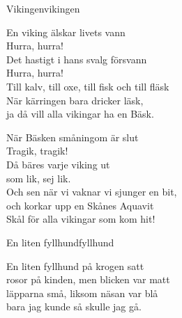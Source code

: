 \begin{song}{Vikingen}{vikingen}
\begin{vers}
En viking älskar livets vann\\
Hurra, hurra!\\
Det hastigt i hans svalg försvann\\
Hurra, hurra!\\
Till kalv, till oxe, till fisk och till fläsk\\
När kärringen bara dricker läsk,   \\
ja då vill alla vikingar ha en Bäsk.\\
\end{vers}
\begin{vers}
När Bäsken småningom är slut\\
Tragik, tragik! \\
Då bäres varje viking ut\\
som lik, sej lik.\\
Och sen när vi vaknar vi sjunger en bit,\\
och korkar upp en Skånes Aquavit\\
Skål för alla vikingar som kom hit!\\
\end{vers}
\end{song}

\begin{song}{En liten fyllhund}{fyllhund}
\begin{vers}
En liten fyllhund på krogen satt\\
rosor på kinden, men blicken var matt\\
läpparna små, liksom näsan var blå\\
bara jag kunde så skulle jag gå.\\
\end{vers}
\end{song}

\newpage


